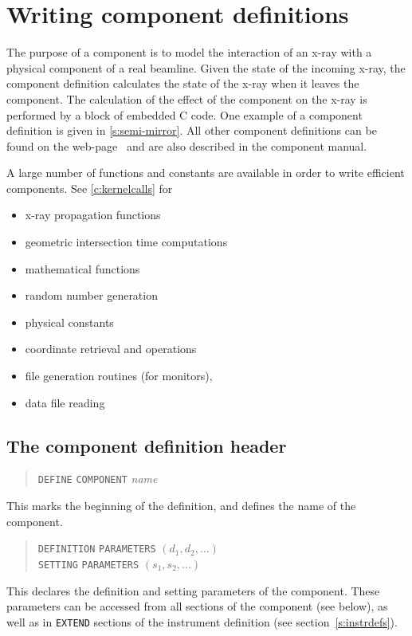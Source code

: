 
\section{Writing component definitions}
\label{s:compdefs}

The purpose of a \MCX component is to model the interaction of an
x-ray with a physical component of a real beamline. Given the
state of the incoming x-ray, the
component definition calculates the state of the x-ray when it leaves
the component.  The calculation of the effect of the component on the
x-ray is performed by a block of embedded C code.
One example of a component definition is given in \cref{s:semi-mirror}. All other
component definitions can be found on the \MCX
web-page~\cite{mcxtrace_webpage} and are also described in the \MCX component manual.

A large number of functions and constants are available in
order to write efficient components. See \cref{c:kernelcalls}
for
\begin{itemize}
\item x-ray propagation functions
\item geometric intersection time computations
\item mathematical functions
\item random number generation
\item physical constants
\item coordinate retrieval and operations
\item file generation routines (for monitors),
\item data file reading
\end{itemize}



\subsection{The component definition header}
\label{s:comp-header}

\begin{quote}
  \texttt{DEFINE} \texttt{COMPONENT} \textit{name}
\end{quote}
This marks the beginning of the definition, and defines the name of the
component.
\begin{quote}
  \texttt{DEFINITION} \texttt{PARAMETERS} $(d_1, d_2, \ldots)$ \\
  \texttt{SETTING} \texttt{PARAMETERS} $(s_1, s_2, \ldots)$
\end{quote}
This declares the definition and setting parameters of the component.
These parameters can be
accessed from all sections of the component (see below),
as well as in \verb+EXTEND+ sections of the instrument definition (see section~\ref{s:instrdefs}).

